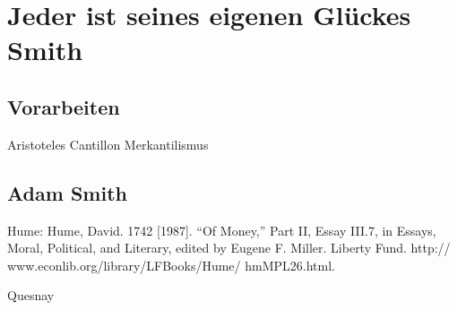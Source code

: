 %
%
%

\chapter{Jeder ist seines eigenen Glückes Smith}
\label{Smith}


\section{Vorarbeiten}
Aristoteles
Cantillon
Merkantilismus

\section{Adam Smith}

Hume:
Hume, David. 1742 [1987]. “Of Money,” Part II,
Essay III.7, in Essays, Moral, Political, and Literary,
edited by Eugene F. Miller. Liberty Fund. http://
www.econlib.org/library/LFBooks/Hume/
hmMPL26.html.


Quesnay

